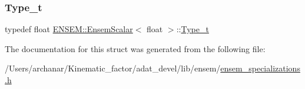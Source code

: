 \subsubsection{\texorpdfstring{Type\_t}{Type\_t}\hspace{0.1cm}{\footnotesize\ttfamily [2/2]}}
{\footnotesize\ttfamily typedef float \mbox{\hyperlink{structENSEM_1_1EnsemScalar}{E\+N\+S\+E\+M\+::\+Ensem\+Scalar}}$<$ float $>$\+::\mbox{\hyperlink{structENSEM_1_1EnsemScalar_3_01float_01_4_a908908baf5b54ef6561962c858fb7183}{Type\+\_\+t}}}



The documentation for this struct was generated from the following file\+:\begin{DoxyCompactItemize}
\item 
/\+Users/archanar/\+Kinematic\+\_\+factor/adat\+\_\+devel/lib/ensem/\mbox{\hyperlink{lib_2ensem_2ensem__specializations_8h}{ensem\+\_\+specializations.\+h}}\end{DoxyCompactItemize}
